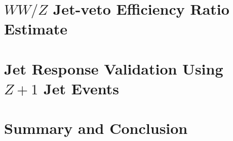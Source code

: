 \documentclass{cmspaper}
\begin{document}
\section {$WW/Z$ Jet-veto Efficiency Ratio Estimate}
\label{sec:wwzratio}


\section {Jet Response Validation Using $Z+1$ Jet Events}
\label{sec:jetresponse}

\clearpage

\section {Summary and Conclusion}
\label{sec:conclusion}



\end{document}
